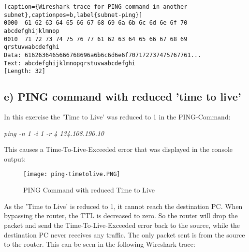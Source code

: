 \begin{lstlisting}[caption={Wireshark trace for PING command in another subnet},captionpos=b,label{subnet-ping}]
0000  61 62 63 64 65 66 67 68 69 6a 6b 6c 6d 6e 6f 70   abcdefghijklmnop
0010  71 72 73 74 75 76 77 61 62 63 64 65 66 67 68 69   qrstuvwabcdefghi
Data: 6162636465666768696a6b6c6d6e6f707172737475767761...
Text: abcdefghijklmnopqrstuvwabcdefghi
[Length: 32]
\end{lstlisting}
\subsection{e) PING command with reduced 'time to live'}
In this exercise the 'Time to Live' was reduced to 1 in the PING-Command:
\begin{center}
	\textit{ping -n 1 -i 1 -r 4 134.108.190.10}
\end{center}
This causes a Time-To-Live-Exceeded error that was displayed in the console output:
\begin{figure}[H]
	\centering
	\texttt{[image: ping-timetolive.PNG]}
	\caption{PING Command with reduced Time to Live}
	\label{ping-timetolive}
\end{figure} 
As the 'Time to Live' is reduced to 1, it cannot reach the destination PC. When bypassing the router, the TTL is decreased to zero. So the router will drop the packet and send the Time-To-Live-Exceeded error back to the source, while the destination PC never receives any traffic. The only packet sent is from the source to the router. This can be seen in the following Wireshark trace:\\
